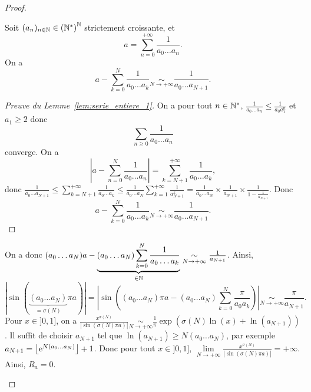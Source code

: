 \documentclass[12pt]{article}
\begin{document}
\begin{proof}
\begin{enumerate}
        \begin{lemma}
            \label{lem:serie_entiere_1}
            Soit $(a_n)_{n\in\mathbb{N}}\in\left(\mathbb{N}^{*}\right)^{\mathbb{N}}$ strictement croissante, et 
            \begin{equation}
                a=\sum_{n=0}^{+\infty}\frac{1}{a_0\dots a_n}.
            \end{equation}
            On a 
            \begin{equation}
                a-\sum_{k=0}^{N}\frac{1}{a_0\dots a_k}\underset{N\to+\infty}{\sim}\frac{1}{a_0\dots a_{N+1}}.
            \end{equation}
        \end{lemma}
        \begin{proof}[Preuve du Lemme~\ref{lem:serie_entiere_1}]
            On a pour tout $n\in\mathbb{N}^{*}$, $\frac{1}{a_{0}\dots a_{n}}\leqslant\frac{1}{a_{0}a_{1}^{n}}$ et $a_{1}\geqslant2$ donc 
            \begin{equation*}
                \sum_{n\geqslant0}\frac{1}{a_{0}\dots a_{n}}    
            \end{equation*}
            converge. On a
            \begin{equation}
                \left\lvert a-\sum_{n=0}^{N}\frac{1}{a_{0}\dots a_{n}}\right\rvert=\sum_{k=N+1}^{+\infty}\frac{1}{a_0\dots a_k},
            \end{equation}
            donc 
            $\frac{1}{a_0\dots a_{N+1}}\leqslant \sum_{k=N+1}^{+\infty}\frac{1}{a_0\dots a_k}\leqslant\frac{1}{a_0\dots a_N}\sum_{k=1}^{+\infty}\frac{1}{a_{N+1}^{k}}=\frac{1}{a_0\dots a_N}\times\frac{1}{a_{N+1}}\times\frac{1}{1-\frac{1}{a_{N+1}}}$. Donc 
            \begin{equation}
                a-\sum_{k=0}^{N}\frac{1}{a_0\dots a_k}\underset{N\to+\infty}{\sim}\frac{1}{a_0\dots a_{N+1}}.
            \end{equation}
        \end{proof}

        On a donc $(a_{0}\dots a_{N})a-\underbrace{(a_0\dots a_{N})\sum_{k=0}^{N}\frac{1}{a_{0}\dots a_{k}}}_{\in\mathbb{N}}\underset{N\to+\infty}{\sim}\frac{1}{a_{N+1}}$. Ainsi,
        \begin{equation}
            \left\lvert\sin\left(\underbrace{(a_0\dots a_N)}_{=\sigma(N)}\pi a\right)\right\rvert=\left\lvert\sin\left((a_0\dots a_N)\pi a-(a_0\dots a_N)\sum_{k=0}^{N}\frac{\pi}{a_{0}a_{k}}\right)\right\rvert\underset{N\to+\infty}{\sim}\frac{\pi}{a_{N+1}}.
        \end{equation}
        Pour $x\in]0,1]$, on a $\frac{x^{\sigma(N)}}{\left\lvert\sin(\sigma(N)\pi a)\right\rvert}\underset{N\to+\infty}{\sim}\frac{1}{\pi}\exp\left(\sigma(N)\ln(x)+\ln(a_{N+1})\right)$. Il suffit de choisir $a_{N+1}$ tel que $\ln(a_{N+1})\geqslant N(a_{0}\dots a_{N})$, par exemple $a_{N+1}=\left\lfloor \mathrm{e}^{N(a_{0}\dots a_{N})}\right\rfloor+1$. Donc pour tout $x\in]0,1]$, $\lim\limits_{N\to+\infty}\frac{x^{\sigma(N)}}{\left\lvert\sin(\sigma(N)\pi a)\right\rvert}=+\infty$. Ainsi, $R_a=0$.
    \end{enumerate}
\end{proof}
\end{document}
